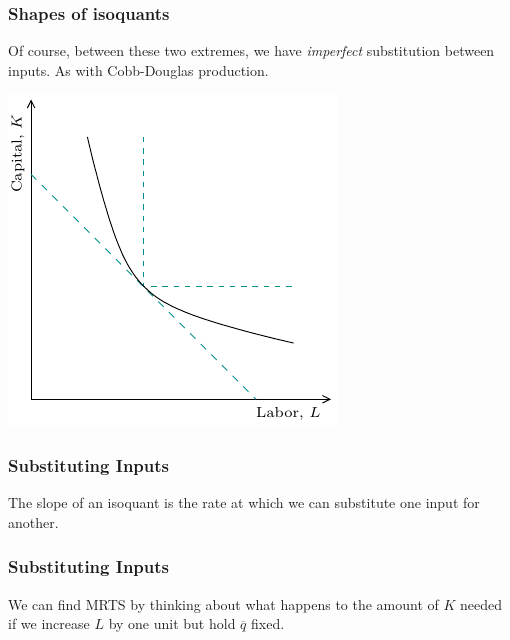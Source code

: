 \documentclass[xcolor=pdftex,dvipsnames]{beamer}
\begin{document}
\begin{frame}
\frametitle{Shapes of isoquants}
Of course, between these two extremes, we have \emph{imperfect}
substitution between inputs. As with Cobb-Douglas production.

\begin{center}
\includegraphics{pics/Imperf}
\end{center}


\end{frame}





\begin{frame}
\frametitle{Substituting Inputs}
The slope of an isoquant is the rate at which we can substitute one
input for another.

\bigskip
{}


\end{frame}

\begin{frame}
\frametitle{Substituting Inputs}
We can find MRTS by thinking about what happens to the amount of
$K$ needed if we increase $L$ by one unit but hold $\overline q$
fixed.
\bigskip

\bigskip

\end{frame}
\end{document}
